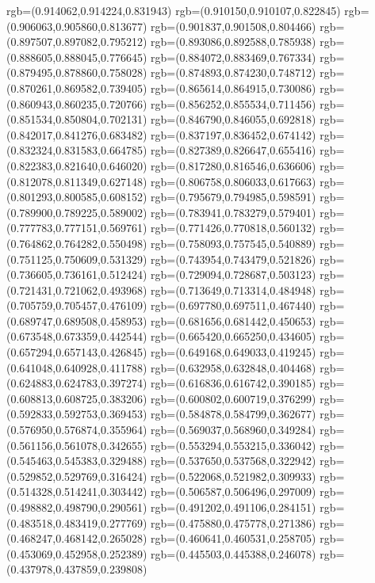{{{			rgb=(0.914062,0.914224,0.831943)
			rgb=(0.910150,0.910107,0.822845)
			rgb=(0.906063,0.905860,0.813677)
			rgb=(0.901837,0.901508,0.804466)
			rgb=(0.897507,0.897082,0.795212)
			rgb=(0.893086,0.892588,0.785938)
			rgb=(0.888605,0.888045,0.776645)
			rgb=(0.884072,0.883469,0.767334)
			rgb=(0.879495,0.878860,0.758028)
			rgb=(0.874893,0.874230,0.748712)
			rgb=(0.870261,0.869582,0.739405)
			rgb=(0.865614,0.864915,0.730086)
			rgb=(0.860943,0.860235,0.720766)
			rgb=(0.856252,0.855534,0.711456)
			rgb=(0.851534,0.850804,0.702131)
			rgb=(0.846790,0.846055,0.692818)
			rgb=(0.842017,0.841276,0.683482)
			rgb=(0.837197,0.836452,0.674142)
			rgb=(0.832324,0.831583,0.664785)
			rgb=(0.827389,0.826647,0.655416)
			rgb=(0.822383,0.821640,0.646020)
			rgb=(0.817280,0.816546,0.636606)
			rgb=(0.812078,0.811349,0.627148)
			rgb=(0.806758,0.806033,0.617663)
			rgb=(0.801293,0.800585,0.608152)
			rgb=(0.795679,0.794985,0.598591)
			rgb=(0.789900,0.789225,0.589002)
			rgb=(0.783941,0.783279,0.579401)
			rgb=(0.777783,0.777151,0.569761)
			rgb=(0.771426,0.770818,0.560132)
			rgb=(0.764862,0.764282,0.550498)
			rgb=(0.758093,0.757545,0.540889)
			rgb=(0.751125,0.750609,0.531329)
			rgb=(0.743954,0.743479,0.521826)
			rgb=(0.736605,0.736161,0.512424)
			rgb=(0.729094,0.728687,0.503123)
			rgb=(0.721431,0.721062,0.493968)
			rgb=(0.713649,0.713314,0.484948)
			rgb=(0.705759,0.705457,0.476109)
			rgb=(0.697780,0.697511,0.467440)
			rgb=(0.689747,0.689508,0.458953)
			rgb=(0.681656,0.681442,0.450653)
			rgb=(0.673548,0.673359,0.442544)
			rgb=(0.665420,0.665250,0.434605)
			rgb=(0.657294,0.657143,0.426845)
			rgb=(0.649168,0.649033,0.419245)
			rgb=(0.641048,0.640928,0.411788)
			rgb=(0.632958,0.632848,0.404468)
			rgb=(0.624883,0.624783,0.397274)
			rgb=(0.616836,0.616742,0.390185)
			rgb=(0.608813,0.608725,0.383206)
			rgb=(0.600802,0.600719,0.376299)
			rgb=(0.592833,0.592753,0.369453)
			rgb=(0.584878,0.584799,0.362677)
			rgb=(0.576950,0.576874,0.355964)
			rgb=(0.569037,0.568960,0.349284)
			rgb=(0.561156,0.561078,0.342655)
			rgb=(0.553294,0.553215,0.336042)
			rgb=(0.545463,0.545383,0.329488)
			rgb=(0.537650,0.537568,0.322942)
			rgb=(0.529852,0.529769,0.316424)
			rgb=(0.522068,0.521982,0.309933)
			rgb=(0.514328,0.514241,0.303442)
			rgb=(0.506587,0.506496,0.297009)
			rgb=(0.498882,0.498790,0.290561)
			rgb=(0.491202,0.491106,0.284151)
			rgb=(0.483518,0.483419,0.277769)
			rgb=(0.475880,0.475778,0.271386)
			rgb=(0.468247,0.468142,0.265028)
			rgb=(0.460641,0.460531,0.258705)
			rgb=(0.453069,0.452958,0.252389)
			rgb=(0.445503,0.445388,0.246078)
			rgb=(0.437978,0.437859,0.239808)
}}}

